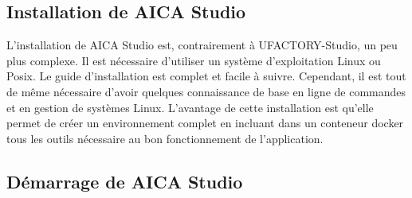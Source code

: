 \subsection{Installation de AICA Studio}
L'installation de AICA Studio est, contrairement à UFACTORY-Studio, un peu plus complexe. Il est nécessaire d'utiliser un système d'exploitation Linux ou Posix. Le guide d'installation \cite{AICADocs} est complet et facile à suivre. Cependant, il est tout de même nécessaire d'avoir quelques connaissance de base en ligne de commandes et en gestion de systèmes Linux. L'avantage de cette installation est qu'elle permet de créer un environnement complet en incluant dans un \gls{conteneur} \gls{docker} tous les outils nécessaire au bon fonctionnement de l'application.

\subsection{Démarrage de AICA Studio}
